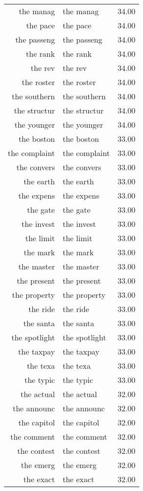 \begin{table}[ht]
\begin{tabular}{rlr}
  the manag & the manag & 34.00 \\ 
  the pace & the pace & 34.00 \\ 
  the passeng & the passeng & 34.00 \\ 
  the rank & the rank & 34.00 \\ 
  the rev & the rev & 34.00 \\ 
  the roster & the roster & 34.00 \\ 
  the southern & the southern & 34.00 \\ 
  the structur & the structur & 34.00 \\ 
  the younger & the younger & 34.00 \\ 
  the boston & the boston & 33.00 \\ 
  the complaint & the complaint & 33.00 \\ 
  the convers & the convers & 33.00 \\ 
  the earth & the earth & 33.00 \\ 
  the expens & the expens & 33.00 \\ 
  the gate & the gate & 33.00 \\ 
  the invest & the invest & 33.00 \\ 
  the limit & the limit & 33.00 \\ 
  the mark & the mark & 33.00 \\ 
  the master & the master & 33.00 \\ 
  the present & the present & 33.00 \\ 
  the property & the property & 33.00 \\ 
  the ride & the ride & 33.00 \\ 
  the santa & the santa & 33.00 \\ 
  the spotlight & the spotlight & 33.00 \\ 
  the taxpay & the taxpay & 33.00 \\ 
  the texa & the texa & 33.00 \\ 
  the typic & the typic & 33.00 \\ 
  the actual & the actual & 32.00 \\ 
  the announc & the announc & 32.00 \\ 
  the capitol & the capitol & 32.00 \\ 
  the comment & the comment & 32.00 \\ 
  the contest & the contest & 32.00 \\ 
  the emerg & the emerg & 32.00 \\ 
  the exact & the exact & 32.00 \\ 

\end{tabular}
\end{table}

